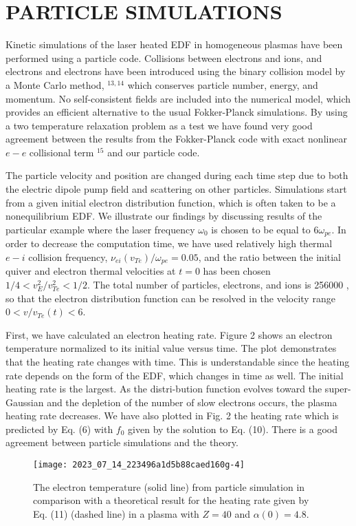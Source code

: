 \documentclass[oneside,onecolumn]{article}
\begin{document}
\begin{sloppypar}
 \section{PARTICLE SIMULATIONS}
 Kinetic simulations of the laser heated EDF in homogeneous plasmas have been performed using a particle code. Collisions between electrons and ions, and electrons and electrons have been introduced using the binary collision model by a Monte Carlo method, ${ }^{13,14}$ which conserves particle number, energy, and momentum. No self-consistent fields are included into the numerical model, which provides an efficient alternative to the usual Fokker-Planck simulations. By using a two temperature relaxation problem as a test we have found very good agreement between the results from the Fokker-Planck code with exact nonlinear $e-e$ collisional term ${ }^{15}$ and our particle code.
 
 The particle velocity and position are changed during each time step due to both the electric dipole pump field and scattering on other particles. Simulations start from a given initial electron distribution function, which is often taken to be a nonequilibrium EDF. We illustrate our findings by discussing results of the particular example where the laser frequency $\omega_{0}$ is chosen to be equal to $6 \omega_{p e}$. In order to decrease the computation time, we have used relatively high thermal $e-i$ collision frequency, $\nu_{e i}\left(v_{T e}\right) / \omega_{p e}=0.05$, and the ratio between the initial quiver and electron thermal velocities at $t=0$ has been chosen $1 / 4<v_{E}^{2} / v_{T e}^{2}<1 / 2$. The total number of particles, electrons, and ions is 256000 , so that the electron distribution function can be resolved in the velocity range $0<v / v_{T e}(t)<6$.
 
 First, we have calculated an electron heating rate. Figure 2 shows an electron temperature normalized to its initial value versus time. The plot demonstrates that the heating rate changes with time. This is understandable since the heating rate depends on the form of the EDF, which changes in time as well. The initial heating rate is the largest. As the distri-bution function evolves toward the super-Gaussian and the depletion of the number of slow electrons occurs, the plasma heating rate decreases. We have also plotted in Fig. 2 the heating rate which is predicted by Eq. (6) with $f_{0}$ given by the solution to Eq. (10). There is a good agreement between particle simulations and the theory.
 
 \begin{figure}[htbp]
 	\centering
 	\texttt{[image: 2023\_07\_14\_223496a1d5b88caed160g-4]}
 	\caption{The electron temperature (solid line) from particle simulation in comparison with a theoretical result for the heating rate given by Eq. (11) (dashed line) in a plasma with $Z=40$ and $\alpha(0)=4.8$.}
 	\label{figure2}
 \end{figure}
 

\end{sloppypar}
\end{document}
